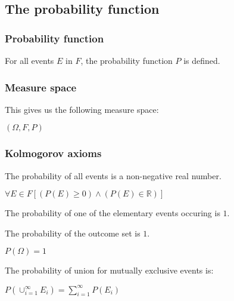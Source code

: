 
\subsection{The probability function}

\subsubsection{Probability function}

For all events \(E\) in \(F\), the probability function \(P\) is defined.

\subsubsection{Measure space}

This gives us the following measure space:

\((\Omega, F, P)\)

\subsubsection{Kolmogorov axioms}


The probability of all events is a non-negative real number.

\(\forall E \in F [(P(E)\ge 0)\land (P(E)\in \mathbb{R})]\)


The probability of one of the elementary events occuring is \(1\).

The probability of the outcome set is \(1\).

\(P(\Omega )=1\)


The probability of union for mutually exclusive events is:

\(P(\cup^\infty_{i=1}E_i)=\sum_{i=1}^\infty P(E_i)\)

